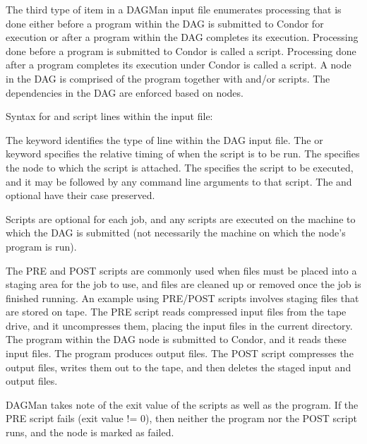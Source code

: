 The third type of item in a DAGMan input file enumerates
processing that is done either before a program within
the DAG is submitted to Condor for execution
or after
a program within
the DAG completes its execution.
Processing done before a program is submitted to Condor is
called a  script.
Processing done after a program completes
its execution under Condor is
called a  script.
A node in the DAG is comprised of the program together with
 and/or  scripts.
The dependencies in the DAG are enforced based on nodes.

Syntax for  and  script lines within the input file:

    

     

The  keyword identifies the type of line within
the DAG input file.
The  or  keyword
specifies the relative timing of when the script is to be run.
The  specifies the node to which the script is attached.
The 
specifies the script to be executed, and it
may be followed by any command line arguments to that script.
The  and optional  have their
case preserved.

Scripts are optional for each job, and
any scripts are executed on the machine
to which the DAG is submitted (not necessarily
the machine on which the node's program is run).

The PRE and POST scripts are commonly used
when files must be placed into a staging area for the job to use,
and files are cleaned up or removed once the job is finished running.
An example using PRE/POST scripts involves staging files
that are stored on tape.
The PRE script reads compressed input files from the tape drive,
and it uncompresses them, placing the input files in the current directory.
The program within the DAG node is submitted to Condor,
and it reads these input files.
The program produces output files.
The POST script compresses the output files, writes them out to
the tape, and then deletes the staged input and output files.

DAGMan takes note of the exit value of the
scripts as well as the program.
If the PRE script fails (exit value != 0), then neither the program nor
the POST script runs, and the node is marked as failed.


